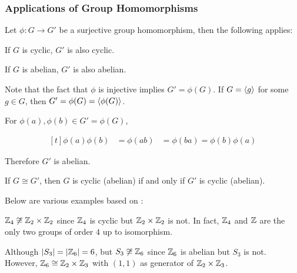 \documentclass[a4paper,12pt]{article}
\begin{document}
\subsubsection{Applications of Group Homomorphisms}
\begin{pst}
  Let $\phi:G\to G'$ be a surjective group homomorphism, then the following applies:

  \begin{alist}
    \item If $G$ is cyclic, $G'$ is also cyclic.
    \item If $G$ is abelian, $G'$ is also abelian.
  \end{alist}

  \prf {} Note that the fact that $\phi$ is injective implies $G'=\phi(G)$. If $G=\left\langle g\right\rangle$ for some $g\in G$, then $G'=\phi(G)=\left\langle \phi(G)\right\rangle$.\n

   For $\phi(a),\phi(b)\in G'=\phi(G)$,

  $$\begin{aligned}[t]
    \phi(a)\phi(b)&=\phi(ab)
    &=\phi(ba)=\phi(b)\phi(a)
  \end{aligned}$$\s

  Therefore $G'$ is abelian.
\end{pst}\n

\begin{crl}
  If $G\cong G'$, then $G$ is cyclic (abelian) if and only if $G'$ is cyclic (abelian).
\end{crl}\n

\begin{exm}
  Below are various examples based on \rpst[\sctr{1}]:

  \begin{alist}
    \item $\mathbb{Z}_{4}\not\cong\mathbb{Z}_{2}\times\mathbb{Z}_{2}$ since $\mathbb{Z}_{4}$ is cyclic but $\mathbb{Z}_{2}\times\mathbb{Z}_{2}$ is not. In fact, $\mathbb{Z}_{4}$ and $\mathbb{Z}$ are the only two groups of order $4$ up to isomorphism.
    \item Although $\left| S_{3}\right|=\left| \mathbb{Z}_{6}\right|=6$, but $S_{3}\not\cong\mathbb{Z}_{6}$ since $\mathbb{Z}_{6}$ is abelian but $S_{3}$ is not. However, $\mathbb{Z}_{6}\cong\mathbb{Z}_{2}\times\mathbb{Z}_{3}$ with $(1,1)$ as generator of $\mathbb{Z}_{2}\times\mathbb{Z}_{3}$.
  \end{alist}
\end{exm}
\end{document}
